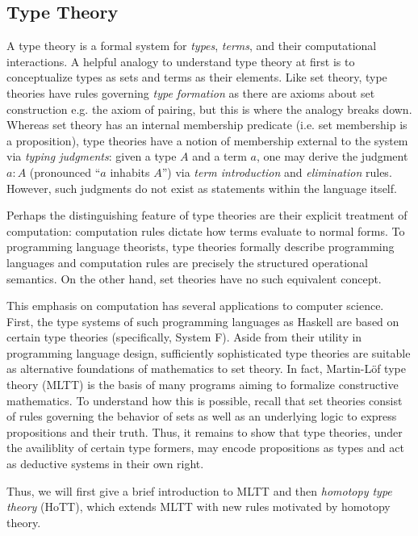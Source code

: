 \documentclass[12pt, letterpaper]{article}
\theoremstyle{definition}
\begin{document}
\subsection{Type Theory}

A type theory is a formal system for \emph{types}, \emph{terms}, and their computational interactions. A helpful analogy to understand type theory at first is to conceptualize types as sets and terms as their elements. Like set theory, type theories have rules governing \emph{type formation} as there are axioms about set construction e.g. the axiom of pairing, but this is where the analogy breaks down. Whereas set theory has an internal membership predicate (i.e. set membership is a proposition), type theories have a notion of membership external to the system via \emph{typing judgments}: given a type $A$ and a term $a$, one may derive the judgment $a : A$ (pronounced ``$a$ inhabits $A$'') via \emph{term introduction} and \emph{elimination} rules. However, such judgments do not exist as statements within the language itself.

Perhaps the distinguishing feature of type theories are their explicit treatment of computation: computation rules dictate how terms evaluate to normal forms. To programming language theorists, type theories formally describe programming languages and computation rules are precisely the structured operational semantics. On the other hand, set theories have no such equivalent concept.

This emphasis on computation has several applications to computer science. First, the type systems of such programming languages as Haskell are based on certain type theories (specifically, System F). Aside from their utility in programming language design, sufficiently sophisticated type theories are suitable as alternative foundations of mathematics to set theory. In fact, Martin-L\"of type theory (MLTT) is the basis of many programs aiming to formalize constructive mathematics. To understand how this is possible, recall that set theories consist of rules governing the behavior of sets as well as an underlying logic to express propositions and their truth. Thus, it remains to show that type theories, under the availiblity of certain type formers, may encode propositions as types and act as deductive systems in their own right.

Thus, we will first give a brief introduction to MLTT and then \emph{homotopy type theory} (HoTT), which extends MLTT with new rules motivated by homotopy theory.
\end{document}
